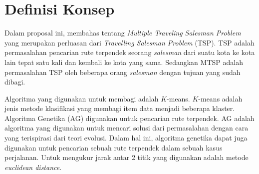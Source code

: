 \section{Definisi Konsep}

Dalam proposal ini, membahas tentang \textit{Multiple Traveling Salesman Problem} yang merupakan perluasan dari \textit{Travelling Salesman Problem} (TSP). TSP adalah permasalahan pencarian rute terpendek seorang \textit{salesman} dari suatu kota ke kota lain tepat satu kali dan kembali ke kota yang sama. Sedangkan MTSP adalah permasalahan TSP oleh beberapa orang \textit{salesman} dengan tujuan yang sudah dibagi.

Algoritma yang digunakan untuk membagi adalah $K$-means. $K$-means adalah jenis metode klasifikasi yang membagi item data menjadi beberapa klaster. Algoritma Genetika (AG) digunakan untuk pencarian rute terpendek. AG adalah algoritma yang digunakan untuk mencari solusi dari permasalahan dengan cara yang terispirasi dari teori evolusi. Dalam hal ini, algoritma genetika dapat juga digunakan untuk pencarian sebuah rute terpendek dalam sebuah kasus perjalanan. Untuk mengukur jarak antar 2 titik yang digunakan adalah metode \textit{euclidean distance}.
